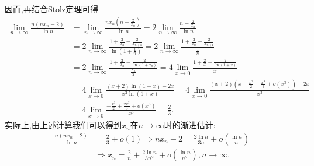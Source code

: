 \documentclass[lang=cn,newtx,10pt,scheme=chinese]{elegantbook}
\begin{document}
\begin{solution}
\begin{enumerate}
因而,再结合Stolz定理可得
\begin{align*}
\lim_{n\rightarrow\infty}\frac{n(nx_n - 2)}{\ln n}&=\lim_{n\rightarrow\infty}\frac{nx_n\left(n - \frac{2}{x_n}\right)}{\ln n}=2\lim_{n\rightarrow\infty}\frac{n - \frac{2}{x_n}}{\ln n}\\
&=2\lim_{n\rightarrow\infty}\frac{1 + \frac{2}{x_n} - \frac{2}{x_{n + 1}}}{\ln\left(1 + \frac{1}{n}\right)}=2\lim_{n\rightarrow\infty}\frac{1 + \frac{2}{x_n} - \frac{2}{x_{n + 1}}}{\frac{1}{n}}\\
&=2\lim_{n\rightarrow\infty}\frac{1 + \frac{2}{x_n} - \frac{2}{\ln(1 + x_n)}}{\frac{x_n}{2}}=4\lim_{x\rightarrow0}\frac{1 + \frac{2}{x} - \frac{2}{\ln(1 + x)}}{x}\\
&=4\lim_{x\rightarrow0}\frac{(x + 2)\ln(1 + x) - 2x}{x^2\ln(1 + x)}=4\lim_{x\rightarrow0}\frac{(x + 2)\left(x - \frac{x^2}{2} + \frac{x^3}{3} + o(x^3)\right) - 2x}{x^3}\\
&=4\lim_{x\rightarrow0}\frac{-\frac{x^3}{2} + \frac{2x^3}{3} + o(x^3)}{x^3}=\frac{2}{3}.
\end{align*}
实际上,由上述计算我们可以得到\(x_n\)在\(n\rightarrow\infty\)时的渐进估计:
\begin{align*}
\frac{n(nx_n - 2)}{\ln n}&=\frac{2}{3} + o(1)\Rightarrow nx_n - 2=\frac{2\ln n}{3n} + o\left(\frac{\ln n}{n}\right)\\
&\Rightarrow x_n=\frac{2}{n} + \frac{2\ln n}{3n^2} + o\left(\frac{\ln n}{n^2}\right),n\rightarrow\infty.
\end{align*}


\end{enumerate}
\end{solution}
\end{document}
